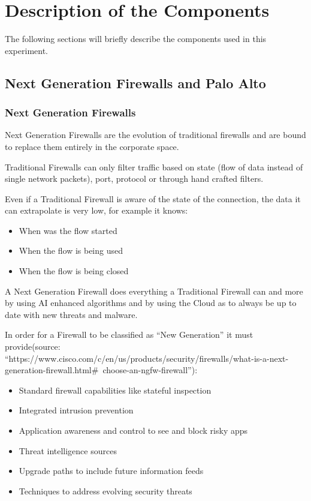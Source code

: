 \documentclass[status=normal,cover=tesi,language=en]{gmeepd}
\begin{document}
\chapter{Description of the Components}

The following sections will briefly describe the components used in this experiment.

\section{Next Generation Firewalls and Palo Alto}

\subsection{Next Generation Firewalls}

Next Generation Firewalls are the evolution of traditional firewalls and are bound to replace them entirely in the corporate space.

Traditional Firewalls can only filter traffic based on state (flow of data instead of single network packets), port, protocol or through hand crafted filters.

Even if a Traditional Firewall is aware of the state of the connection, the data it can extrapolate is very low, for example it knows:

\begin{itemize}
 \item When was the flow started
 \item When the flow is being used
 \item When the flow is being closed
\end{itemize}

\pagebreak

A Next Generation Firewall does everything a Traditional Firewall can and more by using AI enhanced algorithms  and by using the Cloud as to always be up to date with new threats and malware.

In order for a Firewall to be classified as ``New Generation'' it must provide(source: ``https://www.cisco.com/c/en/us/products/security/firewalls/what-is-a-next-generation-firewall.html\#~choose-an-ngfw-firewall''):

\begin{itemize}
 \item Standard firewall capabilities like stateful inspection
 \item Integrated intrusion prevention
 \item Application awareness and control to see and block risky apps
 \item Threat intelligence sources
 \item Upgrade paths to include future information feeds
 \item Techniques to address evolving security threats
\end{itemize}
\end{document}
